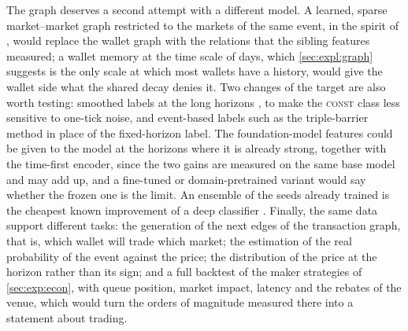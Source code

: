 The graph deserves a second attempt with a different model.  A learned, sparse
market--market graph restricted to the markets of the same event, in the spirit of
\textcite{cini2023sparse}, would replace the wallet graph with the relations that the
sibling features measured; a wallet memory at the time scale of days, which
\cref{sec:expl:graph} suggests is the only scale at which most wallets have a history, would
give the wallet side what the shared decay denies it.  Two changes of the target are also
worth testing: smoothed labels at the long horizons \cite{berti2025tlob}, to make the
\textsc{const} class less sensitive to one-tick noise, and event-based labels such as the
triple-barrier method \cite{lopezdeprado2018advances} in place of the fixed-horizon label.
The foundation-model features could be given to the model at the horizons where it is
already strong, together with the time-first encoder, since the two gains are measured on
the same base model and may add up, and a fine-tuned or domain-pretrained variant would
say whether the frozen one is the limit.  An ensemble of the seeds already trained is the
cheapest known improvement of a deep classifier \cite{lakshminarayanan2017ensembles}.
Finally, the same data support different tasks: the generation of the next edges of the
transaction graph, that is, which wallet will trade which market; the estimation of the
real probability of the event against the price; the distribution of the price at the
horizon rather than its sign; and a full backtest of the maker strategies of
\cref{sec:exp:econ}, with queue position, market impact, latency and the rebates of the venue,
which would turn the orders of magnitude measured there into a statement about trading.
